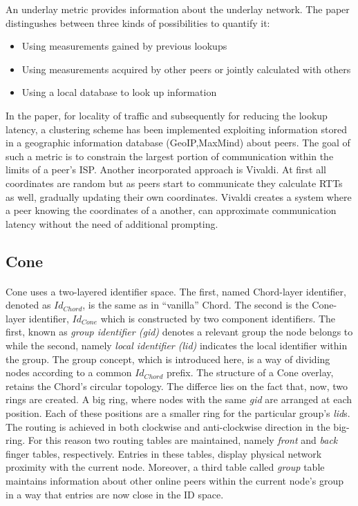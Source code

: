 \documentclass[a4paper,10pt]{article}
\begin{document}
An underlay metric provides information about the underlay network. The paper distingushes between three kinds of possibilities to quantify it:
\begin{itemize}
 \item Using measurements gained by previous lookups
 \item Using measurements acquired by other peers or jointly calculated with others
 \item Using a local database to look up information
\end{itemize}
In the paper, for locality of traffic and subsequently for reducing the lookup latency, a clustering scheme has been implemented exploiting information stored in a geographic information database (GeoIP,MaxMind) about peers. The goal of such a metric is to constrain the largest portion of communication within the limits of a peer's ISP.
Another incorporated approach is Vivaldi\cite{cox_vivaldi_2004}. At first all coordinates are random but as peers start to communicate they calculate RTTs as well, gradually updating their own coordinates. Vivaldi creates a system where a peer knowing the coordinates of a another, can approximate communication latency without the need of additional prompting.

\subsection{Cone}

\paragraph{}
Cone\cite{wang_cone_2007} uses a two-layered identifier space. The first, named Chord-layer identifier, denoted as $Id_{Chord}$, is the same as in ``vanilla'' Chord. The second is the Cone-layer identifier, $Id_{Cone}$ which is constructed by two component identifiers. The first, known as \emph{group identifier (gid)} denotes a relevant group the node belongs to while the second, namely \emph{local identifier (lid)} indicates the local identifier within the group. The group concept, which is introduced here, is a way of dividing nodes according to a common $Id_{Chord}$ prefix.
The structure of a Cone overlay, retains the Chord's circular topology. The differce lies on the fact that, now, two rings are created. A big ring, where nodes with the same \emph{gid} are arranged at each position. Each of these positions are a smaller ring for the particular group's \emph{lid}s. The routing is achieved in both clockwise and anti-clockwise direction in the big-ring. For this reason two routing tables are maintained, namely \emph{front} and \emph{back} finger tables, respectively. Entries in these tables, display physical network proximity with the current node. Moreover, a third table called \emph{group} table maintains information about other online peers within the current node's group in a way that entries are now close in the ID space.
\end{document}
